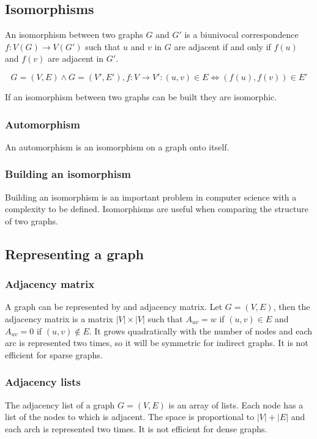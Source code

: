 	\subsection{Isomorphisms}
	An isomorphism between two graphs $G$ and $G'$ is a biunivocal correspondence $f:V(G)\rightarrow V(G')$ such that $u$ and $v$ in $G$ are adjacent if and only if $f(u)$ and $f(v)$ are adjacent in $G'$.

	$$G = (V,E)\land G = (V',E'), f:V \rightarrow V': (u, v)\in E\Leftrightarrow (f(u), f(v))\in E'$$

	If an isomorphism between two graphs can be built they are isomorphic.

		\subsubsection{Automorphism}
		An automorphism is an isomorphism on a graph onto itself.

		\subsubsection{Building an isomorphism}
		Building an isomorphism is an important problem in computer science with a complexity to be defined.
		Isomorphisms are useful when comparing the structure of two graphs.

	\subsection{Representing a graph}

		\subsubsection{Adjacency matrix}
		A graph can be represented by and adjacency matrix.
		Let $G = (V,E)$, then the adjacency matrix is a matrix $|V|\times|V|$ such that $A_{uv} = w$ if $(u,v)\in E$ and $A_{uv} = 0$ if $(u,v)\not\in E$.
		It grows quadratically with the number of nodes and each arc is represented two times, so it will be symmetric for indirect graphs.
		It is not efficient for sparse graphs.

		\subsubsection{Adjacency lists}
		The adjacency list of a graph $G=(V,E)$ is an array of lists.
		Each node has a list of the nodes to which is adjacent.
		The space is proportional to $|V|+|E|$ and each arch is represented two times.
		It is not efficient for dense graphs.

